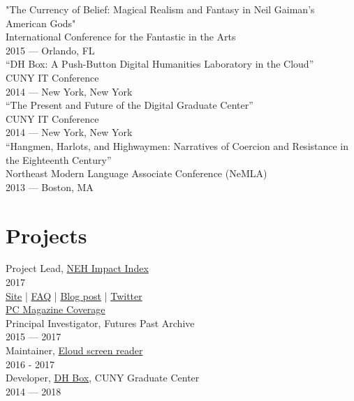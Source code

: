 \documentclass[11pt]{article}
\begin{document}
"The Currency of Belief: Magical Realism and Fantasy in Neil Gaiman’s American Gods"\\
International Conference for the Fantastic in the Arts\\
2015 — Orlando, FL\\

“DH Box: A Push-Button Digital Humanities Laboratory in the Cloud”\\
CUNY IT Conference\\
2014 — New York, New York\\

“The Present and Future of the Digital Graduate Center”\\
CUNY IT Conference\\
2014 — New York, New York\\

“Hangmen, Harlots, and Highwaymen: Narratives of Coercion and Resistance in the Eighteenth Century”\\
Northeast Modern Language Associate Conference (NeMLA)\\
2013 — Boston, MA\\

\section*{Projects}
\label{sec:orgheadline9}
Project Lead, \href{http://www.nehimpact.org/}{NEH Impact Index}\\
2017\\
\href{http://www.nehimpact.org/}{Site} | \href{http://www.nehimpact.org/faq}{FAQ} | \href{https://digitalfellows.commons.gc.cuny.edu/2017/04/10/exploring-the-local-impact-of-the-neh-neh-impact-index/}{Blog post} | \href{https://twitter.com/psmyth01/status/851505002900336644}{Twitter}\\
\href{http://www.pcmag.com/commentary/353904/trump-budget-slashes-neh-funding-why-you-should-care}{PC Magazine Coverage}\\

Principal Investigator, Futures Past Archive\\
2015 — 2017\\

Maintainer, \href{https://github.com/smythp/eloud}{Eloud screen reader}\\
2016 - 2017\\

Developer, \href{http://dhbox.org/}{DH Box}, CUNY Graduate Center\\
2014 — 2018\\
\end{document}

